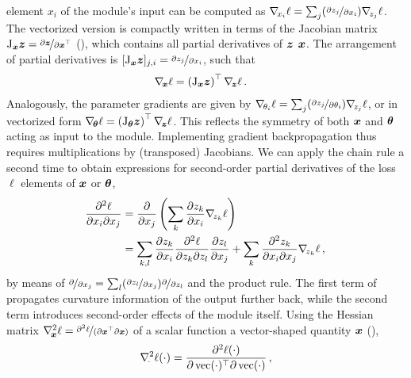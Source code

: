element $x_{i}$ of the module's input can be computed as $\nabla_{\!{x_{i}}}\ell =
\sum_j (\nicefrac{\partial z_j}{\partial x_i}) \nabla_{\!{z_{j}}}\ell$. The vectorized
version is compactly written in terms of the Jacobian matrix $\mathrm{J}_{{\bm{x}}}{\bm{z}} =
\nicefrac{\partial {\bm{z}}}{\partial {\bm{x}}^\top}$
(), which contains all partial
derivatives of ${\bm{z}}$ \wrt ${\bm{x}}$. The arrangement of partial derivatives is
$[\mathrm{J}_{{\bm{x}}}{\bm{z}} ]_{j,i} = \nicefrac{\partial z_j}{\partial x_i}$, such that
\begin{align}
  \nabla_{\!{{\bm{x}}}} \ell &= \left(\mathrm{J}_{{\bm{x}}}{\bm{z}}\right)^\top \nabla_{\!{{\bm{z}}}} \ell\,.
             \label{hbp::equ:gradientBackpropagation}
\end{align}
Analogously, the parameter gradients are given by $\nabla_{\!{\theta_i}}\ell = \sum_j
(\nicefrac{\partial z_j}{\partial \theta_i}) \nabla_{\!{z_j}}\ell$, or in vectorized form
$\nabla_{\!{{\bm{\theta}}}}\ell = \left( \mathrm{J}_{{\bm{\theta}}} {\bm{z}} \right)^\top \nabla_{\!{{\bm{z}}}}\ell$.
This reflects the symmetry of both ${\bm{x}}$ and ${\bm{\theta}}$ acting as input to the
module. Implementing gradient backpropagation thus requires multiplications by
(transposed) Jacobians. We can apply the chain rule a second time to obtain
expressions for second-order partial derivatives of the loss $\ell$
\wrt elements of ${\bm{x}}$ or ${\bm{\theta}}$,
\begin{align}
  \label{hbp::equ:chainRuleComponentwise}
  \begin{split}
    \!\frac{\partial^2 \ell}{\partial x_i \partial x_j}
    &=
      \frac{\partial}{\partial x_j}\left( \sum_k \frac{\partial z_k}{\partial x_i}
      \nabla_{\!{z_k}}\ell \right)
    \\
    &= \sum_{k, l} \frac{\partial z_k}{\partial x_i} \frac{\partial^2
      \ell}{\partial z_k \partial z_l} \frac{\partial z_l}{\partial x_j} +\sum_k
      \frac{\partial^2 z_k}{\partial x_i \partial x_j} \nabla_{\!{z_k}}\ell\,,
  \end{split}
\end{align}
by means of $\nicefrac{\partial}{\partial x_j} = \sum_l (\nicefrac{\partial
  z_l}{\partial x_j}) \nicefrac{\partial}{\partial z_l}$ and the product rule.
The first term of  propagates curvature
information of the output further back, while the second term introduces
second-order effects of the module itself. Using the Hessian matrix
$\nabla_{\!{{\bm{x}}}}^{2}\ell = \nicefrac{\partial^2 \ell}{(\partial {\bm{x}}^\top \partial
  {\bm{x}})}$ of a scalar function \wrt a vector-shaped quantity ${\bm{x}}$
(),
\begin{align}
  \nabla_{\!{\cdot}}^{2}\ell(\cdot) = \frac{\partial^2 \ell(\cdot)}{\partial
  \operatorname{vec}(\cdot)^\top \partial \operatorname{vec}(\cdot)}\,,
\end{align}
